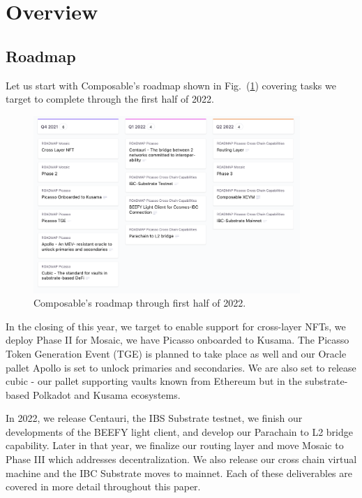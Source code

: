 \section{Overview}

\subsection{Roadmap\label{sec:roadmap}}

Let us start with Composable's roadmap shown in Fig.~(\ref{fig:roadmap}) covering tasks we target to complete through the first half of 2022.
%
\begin{figure}
    \centering
    \includegraphics[width=0.9\textwidth]{images/roadmap.png}
    \caption{Composable's roadmap through first half of 2022.\label{fig:roadmap}}
\end{figure}
%
In the closing of this year, we target to enable support for cross-layer NFTs, we deploy Phase II for Mosaic, we have Picasso onboarded to Kusama.
%
The Picasso Token Generation Event (TGE) is planned to take place as well and our Oracle pallet Apollo is set to unlock primaries and secondaries.
%
We are also set to release cubic - our pallet supporting vaults known from Ethereum but in the substrate-based Polkadot and Kusama ecosystems.

In 2022, we release Centauri, the IBS Substrate testnet, we finish our developments of the BEEFY light client, and develop our Parachain to L2 bridge capability.
%
Later in that year, we finalize our routing layer and move Mosaic to Phase III which addresses decentralization. We also release our cross chain virtual machine and the IBC Substrate moves to mainnet.
%
Each of these deliverables are covered in more detail throughout this paper.

